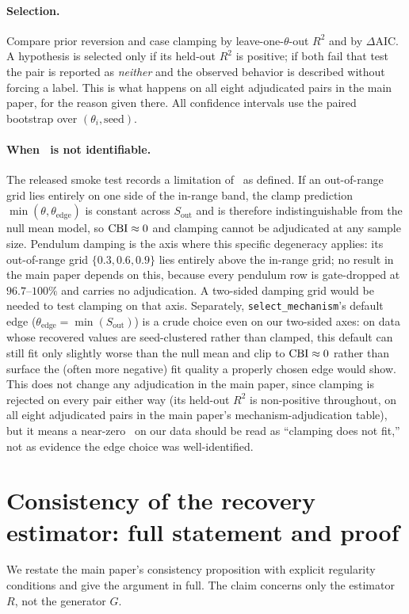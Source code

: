 \documentclass[10pt,twocolumn,letterpaper]{article}
\begin{document}
\paragraph{Selection.}
Compare prior reversion and case clamping by leave-one-$\theta$-out $R^2$ and by $\Delta$AIC. A
hypothesis is selected only if its held-out $R^2$ is positive; if both fail
that test the pair is reported as \emph{neither} and the observed behavior is
described without forcing a label. This is what happens on all eight
adjudicated pairs in the main paper, for the reason given there. All
confidence intervals use the paired bootstrap over $(\theta_i,\text{seed})$.

\paragraph{When \CBI\ is not identifiable.}
The released smoke test records a limitation of \CBI\ as defined. If an
out-of-range grid lies entirely on one side of the in-range band, the clamp
prediction $\min(\theta,\theta_{\text{edge}})$ is constant across
$S_\text{out}$ and is therefore indistinguishable from the null mean model,
so $\mathrm{CBI}\approx0$ and clamping cannot be adjudicated at any sample size.
Pendulum damping is the axis where this specific degeneracy applies: its
out-of-range grid $\{0.3,0.6,0.9\}$ lies entirely above the in-range grid;
no result in the main paper depends on this, because every pendulum row is
gate-dropped at $96.7$--$100\%$ and carries no adjudication. A two-sided
damping grid would be needed to test clamping on that axis.
Separately, \texttt{select\_mechanism}'s default edge
($\theta_{\text{edge}}=\min(S_\text{out})$) is a crude choice even on our
two-sided axes: on data whose recovered values are seed-clustered rather
than clamped, this default can still fit only slightly worse than the null
mean and clip to $\mathrm{CBI}\approx0$ rather than surface the (often more
negative) fit quality a properly chosen edge would show. This does not
change any adjudication in the main paper, since clamping is rejected on
every pair either way (its held-out $R^2$ is non-positive throughout, on
all eight adjudicated pairs in the main paper's mechanism-adjudication
table), but it means a near-zero \CBI\ on our data should be read as
``clamping does not fit,'' not as evidence the edge choice was
well-identified.

\section{Consistency of the recovery estimator: full statement and proof}
\label{app:proof}
We restate the main paper's consistency proposition with explicit regularity
conditions and give the argument in full. The claim concerns only the
estimator $R$, not the generator $G$.
\end{document}
